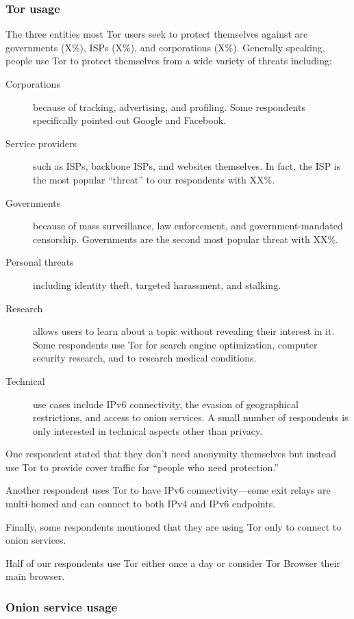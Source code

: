 \subsubsection{Tor usage}
The three entities most Tor users seek to protect themselves against are
governments (X\%), ISPs (X\%), and corporations (X\%).  Generally speaking,
people use Tor to protect themselves from a wide variety of threats including:
\begin{description}
    \item[Corporations] because of tracking, advertising, and profiling.  Some
        respondents specifically pointed out Google and Facebook.
    \item[Service providers] such as ISPs, backbone ISPs, and websites
        themselves.  In fact, the ISP is the most popular ``threat'' to our
        respondents with XX\%.
    \item[Governments] because of mass surveillance, law enforcement, and
        government-mandated censorship.  Governments are the second most
        popular threat with XX\%.
    \item[Personal threats] including identity theft, targeted harassment, and
        stalking.
    \item[Research] allows users to learn about a topic without revealing their
        interest in it.  Some respondents use Tor for search engine
        optimization, computer security research, and to research medical
        conditions.
    \item[Technical] use cases include IPv6 connectivity, the evasion of
        geographical restrictions, and access to onion services.  A small
        number of respondents is only interested in technical aspects other
        than privacy.
\end{description}

One respondent stated that they don't need anonymity themselves but instead use
Tor to provide cover traffic for ``people who need protection.''

Another respondent uses Tor to have IPv6 connectivity---some exit relays are
multi-homed and can connect to both IPv4 and IPv6 endpoints.

Finally, some respondents mentioned that they are using Tor only to connect to
onion services.

Half of our respondents use Tor either once a day or consider Tor Browser their
main browser.

\subsubsection{Onion service usage}

